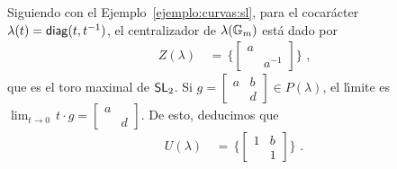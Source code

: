 \begin{ejemploCurvas}\label{ejemplo:unipotente:curvas:sl}
	Siguiendo con el Ejemplo~\ref{ejemplo:curvas:sl}, para el
	cocar\'{a}cter $\lambda(t)=\diag(t,t^{-1})$, el centralizador de
	$\lambda(\multiplicativo)$ est\'{a} dado por
	\begin{align*}
		Z(\lambda) & \,=\,\bigg\{
			\begin{bmatrix} a & \\ & a^{-1} \end{bmatrix}
			\bigg\}
		\text{ ,}
	\end{align*}
	que es el toro maximal de $\SL[2]$. Si
	\begin{math}
		g=\left[\begin{smallmatrix}
			a & b \\ & d
		\end{smallmatrix}\right]\in P(\lambda)
	\end{math}, el l\'{\i}mite es
	\begin{math}
		\lim_{t\to 0}\,t\cdot g=
			\left[\begin{smallmatrix}
				a & \\ & d
			\end{smallmatrix}\right]
	\end{math}. De esto, deducimos que
	\begin{align*}
		U(\lambda) & \,=\,\bigg\{
			\begin{bmatrix} 1 & b \\ & 1 \end{bmatrix}
			\bigg\}
		\text{ .}
	\end{align*}
\end{ejemploCurvas}


